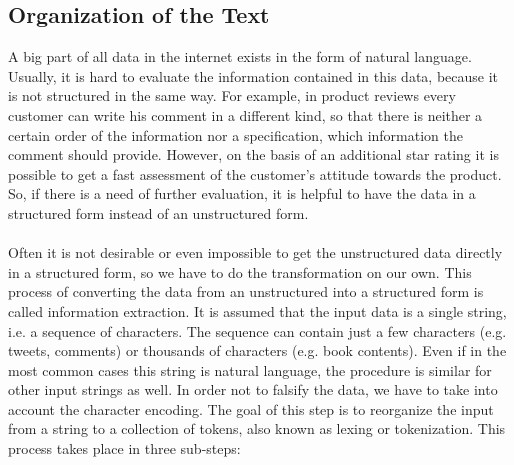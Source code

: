 \documentclass[article,type=msc,colorback,accentcolor=tud7b]{tudthesis}
\begin{document}
  \subsection{Organization of the Text}
    A big part of all data in the internet exists in the form of natural language. Usually, it is hard to evaluate the information contained in this data, because it is not structured in the same way. For example, in product reviews every customer can write his comment in a different kind, so that there is neither a certain order of the information nor a specification, which information the comment should provide. However, on the basis of an additional star rating it is possible to get a fast assessment of the customer’s attitude towards the product. So, if there is a need of further evaluation, it is helpful to have the data in a structured form instead of an unstructured form. \\\\
    Often it is not desirable or even impossible to get the unstructured data directly in a structured form, so we have to do the transformation on our own. This process of converting the data from an unstructured into a structured form is called information extraction. It is assumed that the input data is a single string, i.e. a sequence of characters. The sequence can contain just a few characters (e.g. tweets, comments) or thousands of characters (e.g. book contents). Even if in the most common cases this string is natural language, the procedure is similar for other input strings as well. In order not to falsify the data, we have to take into account the character encoding. The goal of this step is to reorganize the input from a string to a collection of tokens, also known as lexing or tokenization. This process takes place in three sub-steps:
\end{document}
